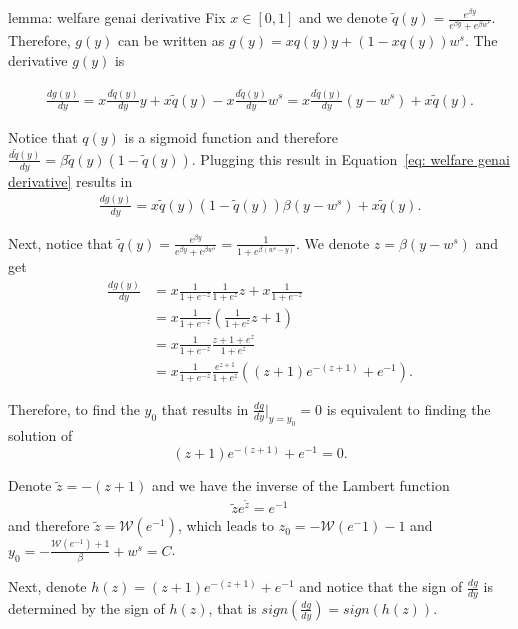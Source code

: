 \begin{proofof}{lemma: welfare genai derivative}
Fix $x \in [0, 1]$ and we denote $\tilde{q}(y) = \frac{e^{\beta y}}{e^{\beta y} + e^{\beta w^s}}$. Therefore, $g(y)$ can be written as $g(y) = xq(y) y + (1-xq(y)) w^s$.
The derivative $g(y)$ is

\begin{align}
\frac{dg(y)}{dy} = x\frac{d \tilde{q}(y)}{dy} y + x\tilde{q}(y) - x\frac{d \tilde{q}(y)}{dy} w^s = x\frac{d \tilde{q}(y)}{dy} (y - w^s) + x\tilde{q}(y). \label{eq: welfare genai derivative}
\end{align}

Notice that $q(y)$ is a sigmoid function and therefore $\frac{d\tilde{q}(y)}{dy} = \beta \tilde{q}(y) \left(1-\tilde{q}(y) \right)$. Plugging this result in Equation~\ref{eq: welfare genai derivative} results in
\begin{align*}
\frac{dg(y)}{dy} = x\tilde{q}(y) \left(1-\tilde{q}(y) \right) \beta (y-w^s) + x\tilde{q}(y).
\end{align*}

Next, notice that $\tilde{q}(y) = \frac{e^{\beta y}}{e^{\beta y} + e^{\beta w^s}} = \frac{1}{1 + e^{\beta (w^s - y)}}$. We denote $z = \beta(y-w^s)$ and get
\begin{align*}
\frac{dg(y)}{dy} &= x\frac{1}{1 + e^{-z}} \frac{1}{1 + e^z} z + x\frac{1}{1 + e^{-z}} \\
&= x\frac{1}{1 + e^{-z}} \left(\frac{1}{1 + e^z} z + 1 \right) \\
&= x\frac{1}{1 + e^{-z}} \frac{z + 1 + e^z}{1 + e^z} \\
&= x\frac{1}{1 + e^{-z}} \frac{e^{z + 1}}{1 + e^z} \left( (z + 1)e^{-(z+1)} + e^{-1} \right).
\end{align*}

Therefore, to find the $y_0$ that results in $\frac{dg}{dy}|_{y = y_0} = 0$ is equivalent to finding the solution of 
\[(z + 1)e^{-(z+1)} + e^{-1} = 0. \]

Denote $\tilde{z} = -(z+1)$ and we have the inverse of the Lambert function
\begin{align*}
\tilde{z} e^{\tilde{z}} = e^{-1}
\end{align*}
and therefore $\tilde{z} = \mathcal{W}(e^{-1})$, which leads to $z_0 = -\mathcal{W}(e^-1) - 1$ and $y_0 = -\frac{\mathcal{W}(e^{-1}) + 1}{\beta} + w^s = C$.

Next, denote $h(z) = (z+1)e^{-(z+1)} + e^{-1}$ and notice that the sign of $\frac{dg}{dy}$ is determined by the sign of $h(z)$, that is $sign(\frac{dg}{dy}) = sign(h(z))$.


\end{proofof}
